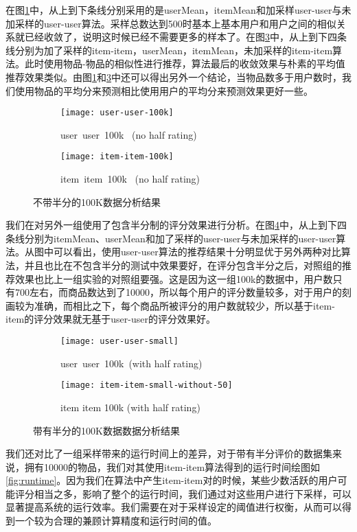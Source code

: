 在图\ref{fig:useruser100k}中，从上到下条线分别采用的是userMean，itemMean和加采样user-user与未加采样的user-user算法。采样总数达到500时基本上基本用户和用户之间的相似关系就已经收敛了，说明这时候已经不需要更多的样本了。在图\ref{fig:itemitem100k}中，从上到下四条线分别为加了采样的item-item，userMean，itemMean，未加采样的item-item算法。此时使用物品-物品的相似性进行推荐，算法最后的收敛效果与朴素的平均值推荐效果类似。由图\ref{fig:useruser100k}和\ref{fig:itemitem100k}中还可以得出另外一个结论，当物品数多于用户数时，我们使用物品的平均分来预测相比使用用户的平均分来预测效果更好一些。
\begin{figure}
\centering
\begin{subfigure}[b]{0.5\textwidth}
\texttt{[image: user-user-100k]}
\caption{user\ user\ 100k \ (no half rating)}
\label{fig:useruser100k}
\end{subfigure}%
\hfill
\begin{subfigure}[b]{0.5\textwidth}
\texttt{[image: item-item-100k]}
\caption{item\ item\ 100k \ (no half rating)}
\label{fig:itemitem100k}
\end{subfigure}
\caption{不带半分的100K数据分析结果}
\end{figure}

我们在对另外一组使用了包含半分制的评分效果进行分析。在图\ref{userusersmall}中，从上到下四条线分别为itemMean、userMean和加了采样的user-user与未加采样的user-user算法。从图中可以看出，使用user-user算法的推荐结果十分明显优于另外两种对比算法，并且也比在不包含半分的测试中效果要好，在评分包含半分之后，对照组的推荐效果也比上一组实验的对照组要强。这是因为这一组100k的数据中，用户数只有700左右，而商品数达到了10000，所以每个用户的评分数量较多，对于用户的刻画较为准确，而相比之下，每个商品所被评分的用户数就较少，所以基于item-item的评分效果就无基于user-user的评分效果好。
\begin{figure}
\centering
\begin{subfigure}[b]{0.5\textwidth}
\texttt{[image: user-user-small]}
\caption{user\ user\ 100k\ (with half rating)}\label{userusersmall}
\end{subfigure}%
\hfill
\begin{subfigure}[b]{0.5\textwidth}
\centering
\texttt{[image: item-item-small-without-50]}
\caption{item item 100k (with half rating)}\label{fig:itemitemsmall}
\end{subfigure}
\caption{带有半分的100K数据数据分析结果}
\end{figure}

我们还对比了一组采样带来的运行时间上的差异，对于带有半分评价的数据集来说，拥有10000的物品，我们对其使用item-item算法得到的运行时间绘图如\ref{fig:runtime}。因为我们在算法中产生item-item对的时候，某些少数活跃的用户可能评分相当之多，影响了整个的运行时间，我们通过对这些用户进行下采样，可以显著提高系统的运行效率。我们需要在对于采样设定的阈值进行权衡，从而可以得到一个较为合理的兼顾计算精度和运行时间的值。

